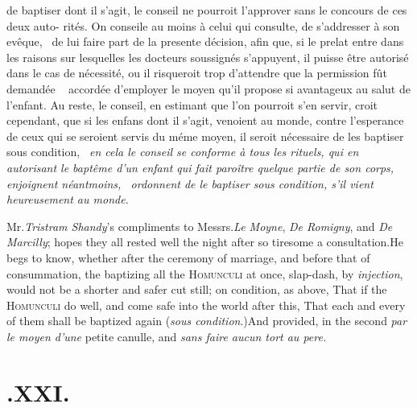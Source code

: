 \documentclass{article}
\begin{document}
de baptiser dont il s’agit, le conseil ne pourroit\break
l’approver sans le concours de ces deux auto-\break
rités.  On conseile au moins à celui qui consulte,\break
de s’addresser à son evêque, \et\  de lui faire part\break
de la presente décision, afin que, si le prelat\break
entre dans les raisons sur lesquelles les docteurs\break
soussignés s’appuyent, il puisse être autorisé\break
dans le cas de nécessité, ou il risqueroit trop\break
d'attendre que la permission fût demandée \et\ \break
accordée d’employer le moyen qu’il propose si\break
avantageux au salut de l’enfant. Au reste,\break
le conseil, en estimant que l’on pourroit s’en\break
servir, croit cependant, que si les enfans dont\break
il s’agit, venoient au monde, contre l’esperance
de ceux qui se seroient servis du méme moyen, il seroit nécessaire de
les baptiser \upshape sous condition, \itshape \et\  en cela le conseil se conforme à
tous les rituels, qui en autorisant le baptême d’un enfant qui fait paroître quelque
partie de son corps, enjoignent néantmoins, \et\  ordonnent de le baptiser \upshape
sous condition, \itshape s’il vient heureusement au monde.  
\egroup 

\noindent
{}

\bigskip

\vbox{}

\bigskip

Mr.\@ \textit{Tristram Shandy}’s compliments to Messrs.\@ \textit{Le
Moyne}, \textit{De Romigny}, and \textit{De Marcilly}; hopes they all
rested well the night after so tiresome a consultation.\tsk\break  He
begs to know, whether after the ceremony of marriage, and before
that of consummation, the baptizing all the
\textsc{Homunculi} at once, slap-dash, by \textit{injection},
would not be a shorter and safer cut still; on condition, as above,
That if the \textsc{Homunculi} do well, and come safe into
the world after this, That each and every of them shall be baptized
again (\textit{sous condition}.)\tsh  And provided, in the
second\break
{}
\textit{par le moyen d’une} petite canulle, and\break 
\textit{sans faire aucun tort au pere.}

\section{.\enspace XXI.}
\end{document}
